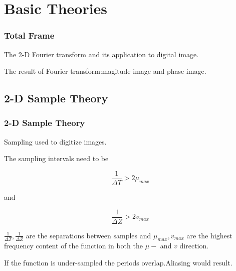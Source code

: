 \documentclass[notheorems, serif, table, compress]{beamer}  %
\begin{document}
\section{Basic Theories} %



\begin{frame}[fragile]
\frametitle{Total Frame}

The 2-D Fourier transform and its application to digital image.


The result of Fourier transform:magitude image and phase image.%
\end{frame}

\subsection{2-D Sample Theory}%
\begin{frame}
\frametitle{2-D Sample Theory}%
 
Sampling used to digitize images.


The sampling intervals need to be

\begin{equation} \label{1}
\frac{1}{\Delta T}>2\mu_{max}
\end{equation}

and 

\begin{equation} \label{2}
\frac{1}{\Delta Z}>2v_{max}
\end{equation}

$\frac{1}{\Delta T},\frac{1}{\Delta Z}$ are the separations between samples and $\mu_{max},v_{max}$ are the highest frequency content of the function in both the $\mu-$ and $v$ direction. %
 

If  the function is under-sampled the periods overlap.Aliasing would result.


\end{frame}
\end{document}
